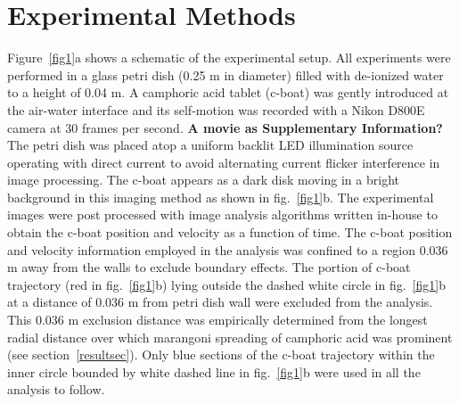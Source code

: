 \documentclass[journal=langd5, manuscript=article, layout=twocolumn]{achemso}
\begin{document}
\section{Experimental Methods}
\label{expsec}
Figure~\ref{fig1}a shows a schematic of the experimental setup. All experiments were performed in a glass petri dish (0.25 m in diameter) filled with de-ionized water to a height of 0.04 m. A camphoric acid tablet (c-boat) was gently introduced at the air-water interface and its self-motion was recorded with a Nikon D800E camera at 30 frames per second. {\bf A movie as Supplementary Information?} The petri dish was placed atop a uniform backlit LED illumination source operating with direct current to avoid alternating current flicker interference in image processing.  The c-boat appears as a dark disk moving in a bright background in this imaging method as shown in fig.~\ref{fig1}b. The experimental images were post processed with image analysis algorithms written in-house to obtain the c-boat position and velocity as a function of time. The c-boat position and velocity information employed in the analysis was confined to a region 0.036 m away from the walls to exclude boundary effects. The portion of c-boat trajectory (red in fig.~\ref{fig1}b) lying outside the dashed white circle in fig.~\ref{fig1}b at a distance of 0.036 m from petri dish wall were excluded from the analysis. This 0.036 m exclusion distance was empirically determined from the longest radial distance over which marangoni spreading of camphoric acid was prominent (see section~\ref{resultsec}). Only blue sections of the c-boat trajectory within the inner circle bounded by white dashed line in fig.~\ref{fig1}b were used in all the analysis to follow.
\end{document}
